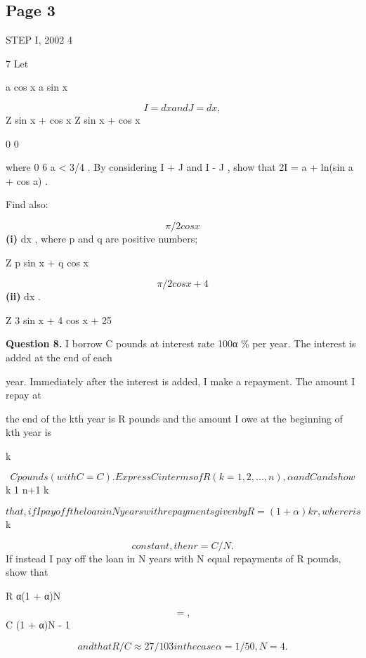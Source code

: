 \documentclass[12pt]{article}
\begin{document}
\subsection*{Page 3}
\begin{flushleft}
STEP I, 2002 4\par
7 Let\par
a cos x a sin x\par
\[I = dx and J = dx ,\]
Z sin x + cos x Z sin x + cos x\par
0 0\par
where 0 6 a < 3\pi/4 . By considering I + J and I - J , show that 2I = a + ln(sin a + cos a) .\par
Find also:\par
\[\pi/2 cos x\]
\textbf{(i)} dx , where p and q are positive numbers;\par
Z p sin x + q cos x\par
\[\pi/2 cos x + 4\]
\textbf{(ii)} dx .\par
Z 3 sin x + 4 cos x + 25\par
\bigskip\textbf{Question 8.} I borrow C pounds at interest rate 100α \% per year. The interest is added at the end of each\par
year. Immediately after the interest is added, I make a repayment. The amount I repay at\par
the end of the kth year is R pounds and the amount I owe at the beginning of kth year is\par
k\par
\[C pounds (with C = C). Express C in terms of R (k = 1, 2, . . ., n), α and C and show\]
k 1 n+1 k\par
\[that, if I pay off the loan in N years with repayments given by R = (1 + α)kr , where r is\]
k\par
\[constant, then r = C/N .\]
If instead I pay off the loan in N years with N equal repayments of R pounds, show that\par
R α(1 + α)N\par
\[= ,\]
C (1 + α)N - 1\par
\[and that R/C \approx 27/103 in the case α = 1/50, N = 4 .\]
\end{flushleft}
\end{document}
